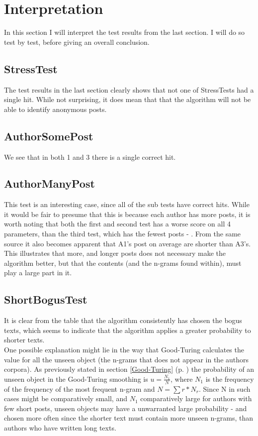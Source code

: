 \section{Interpretation}
\label{interpretation}
In this section I will interpret the test results from the last section. I will do so test by test, before giving an overall conclusion.

\subsection{StressTest}
The test results in the last section clearly shows that not one of StressTests had a single hit. While not surprising, it does mean that that the algorithm will not be able to identify anonymous posts.

\subsection{AuthorSomePost}
We see that in both 1 and 3 there is a single correct hit.

\subsection{AuthorManyPost}
This test is an interesting case, since all of the sub tests have correct hits. While it would be fair to presume that this is because each author has more posts, it is worth noting that both the first and second test has a worse score on all 4 parameters, than the third test, which has the fewest posts - . From the same source it also becomes apparent that A1's post on average are shorter than A3's. This illustrates that more, and longer posts does not necessary make the algorithm better, but that the contents (and the n-grams found within), must play a large part in it.

\subsection{ShortBogusTest}
It is clear from the table that the algorithm consistently has chosen the bogus texts, which seems to indicate that the algorithm applies a greater probability to shorter texts.\\

One possible explanation might lie in the way that Good-Turing calculates the value for all the unseen object (the n-grams that does not appear in the authors corpora). As previously stated in section \ref{Good-Turing} (p. \pageref{Good-Turing}) the probability of an unseen object in the Good-Turing smoothing is $u =\frac{N_1}{N}$, where $N_1$ is the frequency of the frequency of the most frequent n-gram and $N =\sum r * N_r$. Since N in such cases might be comparatively small, and $N_1$ comparatively large for authors with few short posts, unseen objects may have a unwarranted large probability - and chosen more often since the shorter text must contain more unseen n-grams, than authors who have written long texts.\\

